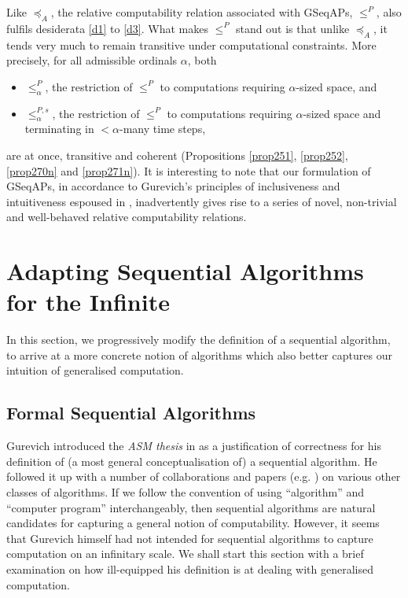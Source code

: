 \documentclass[12pt]{article}
\numberwithin{equation}{section}
\begin{document}
Like $\preceq_A$, the relative computability relation associated with GSeqAPs, $\leq^P$, also fulfils desiderata \ref{d1} to \ref{d3}. What makes $\leq^P$ stand out is that unlike $\preceq_A$, it tends very much to remain transitive under computational constraints. More precisely, for all admissible ordinals $\alpha$, both
\begin{itemize}
    \item $\leq^P_{\alpha}$, the restriction of $\leq^P$ to computations requiring $\alpha$-sized space, and
    \item $\leq^{P, s}_{\alpha}$, the restriction of $\leq^P$ to computations requiring $\alpha$-sized space and terminating in $< \alpha$-many time steps,
\end{itemize}
are at once, transitive and coherent (Propositions \ref{prop251}, \ref{prop252}, \ref{prop270n} and \ref{prop271n}). It is interesting to note that our formulation of GSeqAPs, in accordance to Gurevich's principles of inclusiveness and intuitiveness espoused in \cite{gurevich}, inadvertently gives rise to a series of novel, non-trivial and well-behaved relative computability relations. 

\section{Adapting Sequential Algorithms for the Infinite}\label{sect2}

In this section, we progressively modify the definition of a sequential algorithm, to arrive at a more concrete notion of algorithms which also better captures our intuition of generalised computation. 

\subsection{Formal Sequential Algorithms}\label{ss210}

Gurevich introduced the \textit{ASM thesis} in \cite{gurevich} as a justification of correctness for his definition of (a most general conceptualisation of) a sequential algorithm. He followed it up with a number of collaborations and papers (e.g. \cite{gurevichblass}) on various other classes of algorithms. If we follow the convention of using ``algorithm'' and ``computer program'' interchangeably, then sequential algorithms are natural candidates for capturing a general notion of computability. However, it seems that Gurevich himself had not intended for sequential algorithms to capture computation on an infinitary scale. We shall start this section with a brief examination on how ill-equipped his definition is at dealing with generalised computation. 
\end{document}
